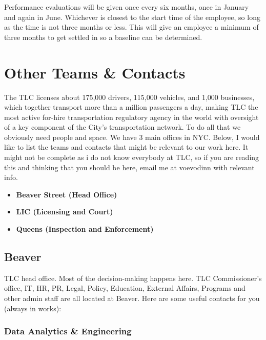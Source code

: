 \documentclass[
]{book}
\begin{document}
Performance evaluations will be given once every six months, once in January and again in June. Whichever is closest to the start time of the employee, so long as the time is not three months or less. This will give an employee a minimum of three months to get settled in so a baseline can be determined.

\hypertarget{other-teams-contacts}{%
\chapter{Other Teams \& Contacts}\label{other-teams-contacts}}

The TLC licenses about 175,000 drivers, 115,000 vehicles, and 1,000 businesses, which together transport more than a million passengers a day, making TLC the most active for-hire transportation regulatory agency in the world with oversight of a key component of the City's transportation network. To do all that we obviously need people and space. We have 3 main offices in NYC. Below, I would like to list the teams and contacts that might be relevant to our work here. It might not be complete as i do not know everybody at TLC, so if you are reading this and thinking that you should be here, email me at voevodinn with relevant info.

\begin{itemize}
\item
  \textbf{Beaver Street (Head Office)}
\item
  \textbf{LIC (Licensing and Court)}
\item
  \textbf{Queens (Inspection and Enforcement)}
\end{itemize}

\hypertarget{beaver}{%
\section{Beaver}\label{beaver}}

TLC head office. Most of the decision-making happens here. TLC Commissioner's office, IT, HR, PR, Legal, Policy, Education, External Affairs, Programs and other admin staff are all located at Beaver. Here are some useful contacts for you (always in works):

\hypertarget{data-analytics-engineering}{%
\subsection{Data Analytics \& Engineering}\label{data-analytics-engineering}}
\end{document}
